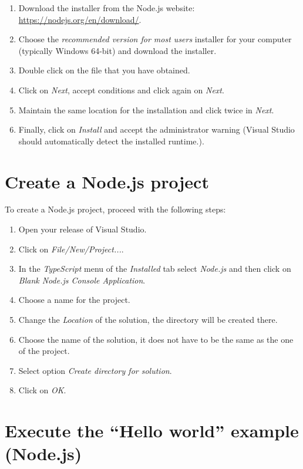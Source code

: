 \begin{enumerate}
    \item Download the installer from the Node.js website: \url{https://nodejs.org/en/download/}.
    \item Choose the \textit{recommended version for most users} installer for your computer (typically Windows 64-bit) and download the installer.
    \item Double click on the file that you have obtained.
    \item Click on \textit{Next}, accept conditions and click again on \textit{Next}.
    \item Maintain the same location for the installation and click twice in \textit{Next}.
    \item Finally, click on \textit{Install} and accept the administrator warning (Visual Studio should automatically detect the installed runtime.).
\end{enumerate}



    \FloatBarrier
    \section{Create a Node.js project}

To create a Node.js project, proceed with the following steps: 

\begin{enumerate}
    \item Open your release of Visual Studio.
    \item Click on \textit{File/New/Project...}.
    \item In the \textit{TypeScript} menu of the \textit{Installed} tab select \textit{Node.js} and then click on \textit{Blank Node.js Console Application}.
    \item Choose a name for the project. 
    \item Change the \textit{Location} of the solution, the directory will be created there.
    \item Choose the name of the solution, it does not have to be the same as the one of the project.  
    \item Select option \textit{Create directory for solution}.
    \item Click on \textit{OK}.
\end{enumerate}




    \FloatBarrier
    \section{Execute the ``Hello world'' example (Node.js)} 
    
